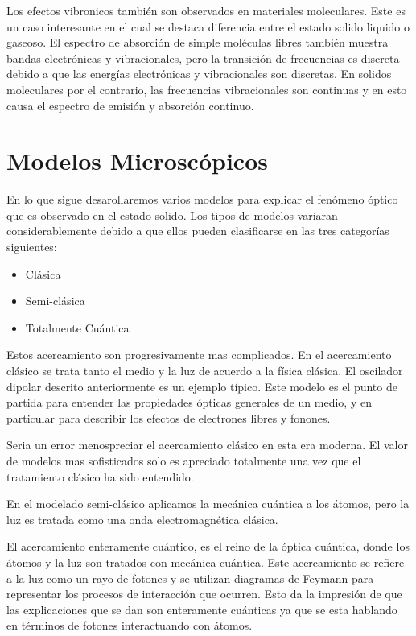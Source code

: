 \documentclass[a4paper,openright,12pt]{book}
\begin{document}
Los efectos vibronicos también son observados en materiales moleculares. Este es un caso interesante en el cual se destaca diferencia entre el estado solido liquido o gaseoso. El espectro de absorción de simple moléculas libres también muestra bandas electrónicas y vibracionales, pero la transición de frecuencias es discreta debido a que las energías electrónicas y vibracionales son discretas. En solidos moleculares por el contrario, las frecuencias vibracionales son continuas y en esto causa el espectro de emisión y absorción continuo.


\section{Modelos Microscópicos}
En lo que sigue desarollaremos varios modelos para explicar el fenómeno óptico que es observado en el estado solido. Los tipos de modelos variaran considerablemente debido a que ellos pueden clasificarse en las tres categorías siguientes:
\begin{itemize}
\item Clásica
\item Semi-clásica
\item Totalmente Cuántica
\end{itemize}

Estos acercamiento son progresivamente mas complicados. En el acercamiento clásico se trata tanto el medio y la luz de acuerdo a la física clásica. El oscilador dipolar descrito anteriormente es un ejemplo típico. Este modelo es el punto de partida para entender las propiedades ópticas generales de un medio, y en particular para describir los efectos de electrones libres y fonones.

Seria un error menospreciar el acercamiento clásico  en esta era moderna. El valor de modelos mas sofisticados solo es apreciado totalmente una vez que el tratamiento clásico ha sido entendido.

En el modelado semi-clásico aplicamos la mecánica cuántica a los átomos, pero la luz es tratada como una onda electromagnética clásica.  

El acercamiento enteramente cuántico, es el reino de la óptica cuántica, donde los átomos y la luz son tratados con mecánica cuántica. Este acercamiento se refiere a la luz como un rayo de fotones y se utilizan diagramas de Feymann para representar los procesos de interacción que ocurren. Esto da la impresión de que las explicaciones que se dan son enteramente cuánticas ya que se esta hablando en términos de fotones interactuando con átomos.
\end{document}
